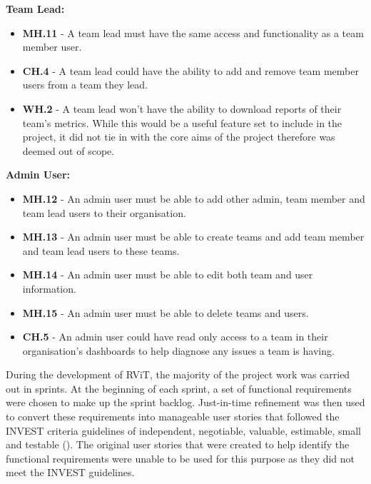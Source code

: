 \documentclass[l4proj.tex]{subfiles}
\begin{document}
\textbf{Team Lead:}
\begin{itemize}
    \item \textbf{MH.11} -  A team lead must have the same access and functionality as a team member user. \\

    \item \textbf{CH.4} - A team lead could have the ability to add and remove team member users from a team they lead. \\

    \item \textbf{WH.2} - A team lead won't have the ability to download reports of their team's metrics. While this would be a useful feature set to include in the project, it did not tie in with the core aims of the project therefore was deemed out of scope.
\end{itemize}
\hfill

\textbf{Admin User:}
\begin{itemize}
    \item \textbf{MH.12} - An admin user must be able to add other admin, team member and team lead users to their organisation. 
    \item \textbf{MH.13} - An admin user must be able to create teams and add team member and team lead users to these teams. 
    \item \textbf{MH.14} - An admin user must be able to edit both team and user information.\\
    \item \textbf{MH.15} - An admin user must be able to delete teams and users.\\

    \item \textbf{CH.5} - An admin user could have read only access to a team in their organisation's dashboards to help diagnose any issues a team is having.\\

\end{itemize}

During the development of RViT, the majority of the project work was carried out in sprints. At the beginning of each sprint, a set of functional requirements were chosen to make up the sprint backlog. Just-in-time refinement was then used to convert these requirements into manageable user stories that followed the INVEST criteria guidelines of independent, negotiable, valuable, estimable, small and testable (\cite{Buglione2013}). The original user stories that were created to help identify the functional requirements were unable to be used for this purpose as they did not meet the INVEST guidelines.
\end{document}
